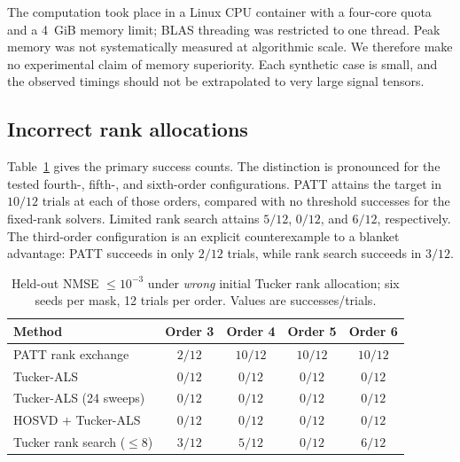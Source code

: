\documentclass[review,10pt]{elsarticle}
\begin{document}
The computation took place in a Linux CPU container with a four-core quota and a 4~GiB memory limit; BLAS threading was restricted to one thread. Peak memory was not systematically measured at algorithmic scale. We therefore make no experimental claim of memory superiority. Each synthetic case is small, and the observed timings should not be extrapolated to very large signal tensors.

\subsection{Incorrect rank allocations}\label{subsec:wrong}
Table~\ref{tab:wrong} gives the primary success counts. The distinction is pronounced for the tested fourth-, fifth-, and sixth-order configurations. PATT attains the target in $10/12$ trials at each of those orders, compared with no threshold successes for the fixed-rank solvers. Limited rank search attains $5/12$, $0/12$, and $6/12$, respectively. The third-order configuration is an explicit counterexample to a blanket advantage: PATT succeeds in only $2/12$ trials, while rank search succeeds in $3/12$.

\begin{table}[tbp]
\caption{Held-out NMSE $\le10^{-3}$ under \emph{wrong} initial Tucker rank allocation; six seeds per mask, 12 trials per order. Values are successes/trials.}\label{tab:wrong}
\centering\small
\begin{tabular}{lcccc}
\toprule
Method & Order 3 & Order 4 & Order 5 & Order 6\\
\midrule
PATT rank exchange & $2/12$ & $10/12$ & $10/12$ & $10/12$\\
Tucker-ALS & $0/12$ & $0/12$ & $0/12$ & $0/12$\\
Tucker-ALS (24 sweeps) & $0/12$ & $0/12$ & $0/12$ & $0/12$\\
HOSVD $+$ Tucker-ALS & $0/12$ & $0/12$ & $0/12$ & $0/12$\\
Tucker rank search ($\le8$) & $3/12$ & $5/12$ & $0/12$ & $6/12$\\
\bottomrule
\end{tabular}
\end{table}
\end{document}
